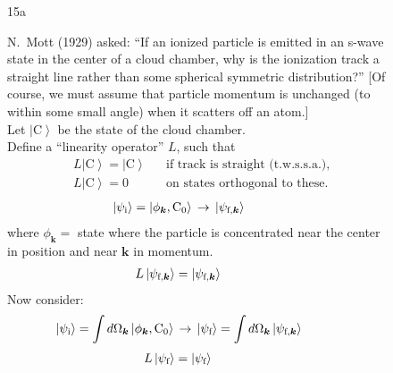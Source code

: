 \documentclass[twocolumn,prb]{revtex4}
\newcommand{\bs}[1]{\boldsymbol{#1}}
\newcommand{\ket}[1]{\left|#1\right\rangle}
\renewcommand{\i}{\text{i}}
\begin{document}
\begin{figure}[htb] 
\begin{mdframed}
  \vspace{5pt}\hfill 15a\\[3pt] 
  \begin{raggedright}
      N.\ Mott (1929) asked: ``If an ionized particle is emitted in
      an s-wave state in the center of a cloud chamber, why is the
      ionization track a straight line rather than some spherical
      symmetric distribution?''  [Of course, we must assume that
        particle momentum is unchanged (to within some small angle)
        when it scatters off an atom.]\\[5pt]
      Let $\ket{\text{C}}$ be the state of the cloud chamber.\\[5pt]
      Define a ``linearity operator'' $L$, such that   
  \begin{align}\nonumber
    &%
    L\ket{\text{C}}=\ket{\text{C}}
    &&\text{if track is straight (t.w.s.s.a.)},\\[2pt]\nonumber
    &%
    L\ket{\text{C}} = 0 &&\text{on states orthogonal to these.}
  \end{align}
  \vspace{-15pt}
  \begin{align}\nonumber
    &\hspace{-20pt}\ket{\psi_\i}=\ket{\phi_{\bs{k}},\text{C}_0}\,\to\,
    \ket{\psi_{\text{f},\bs{k}}}
  \end{align}
  where $\phi_{\bs{k}} =$ state where the particle is concentrated near
  the center in position and near $\bs{k}$ in momentum.
  \begin{align}\nonumber
    &\hspace{-20pt} L\ket{\psi_{\text{f},\bs{k}}}=\ket{\psi_{\text{f},\bs{k}}}
  \end{align}
  Now consider:
  \begin{align}\nonumber
    &\hspace{-20pt}\ket{\psi_\i}
    =\int d\Omega_{\bs{k}}\ket{\phi_{\bs{k}},\text{C}_0}\,\to\,
    \ket{\psi_{\text{f}}}=\int d\Omega_{\bs{k}}\ket{\psi_{\text{f},\bs{k}}}
  \end{align}
  \vspace{-15pt}
  \begin{align}\nonumber
    &\hspace{-20pt} L\ket{\psi_{\text{f}}}=\ket{\psi_{\text{f}}}
  \end{align}
  \end{raggedright}
\vspace{-.5\baselineskip}
\end{mdframed}
\end{figure}
\end{document}
